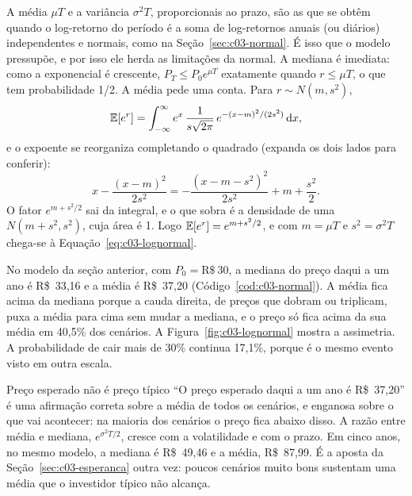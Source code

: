 A média $\mu T$ e a variância $\sigma^2 T$, proporcionais ao prazo, são as que se obtêm quando o log-retorno do período é a soma de log-retornos anuais (ou diários) independentes e normais, como na Seção~\ref{sec:c03-normal}. É isso que o modelo pressupõe, e por isso ele herda as limitações da normal. A mediana é imediata: como a exponencial é crescente, $P_T \le P_0 e^{\mu T}$ exatamente quando $r \le \mu T$, o que tem probabilidade 1/2. A média pede uma conta. Para $r \sim N(m, s^2)$,
\begin{equation*}
  \operatorname{\mathbb{E}}[e^r] = \int_{-\infty}^{\infty} e^x\,\frac{1}{s\sqrt{2\pi}}\,e^{-(x-m)^2/(2s^2)} \mathop{}\!\mathrm{d} x ,
\end{equation*}
e o expoente se reorganiza completando o quadrado (expanda os dois lados para conferir):
\begin{equation*}
  x - \frac{(x-m)^2}{2s^2} = -\frac{(x - m - s^2)^2}{2s^2} + m + \frac{s^2}{2} .
\end{equation*}
O fator $e^{m + s^2/2}$ sai da integral, e o que sobra é a densidade de uma $N(m + s^2, s^2)$, cuja área é 1. Logo $\operatorname{\mathbb{E}}[e^r] = e^{m + s^2/2}$, e com $m = \mu T$ e $s^2 = \sigma^2 T$ chega-se à Equação~\eqref{eq:c03-lognormal}.

No modelo da seção anterior, com $P_0 = \text{R\$}~30$, a mediana do preço daqui a um ano é R\$~33,16 e a média é R\$~37,20 (Código~\ref{cod:c03-normal}). A média fica acima da mediana porque a cauda direita, de preços que dobram ou triplicam, puxa a média para cima sem mudar a mediana, e o preço só fica acima da sua média em 40,5\% dos cenários. A Figura~\ref{fig:c03-lognormal} mostra a assimetria. A probabilidade de cair mais de 30\% continua 17,1\%, porque é o mesmo evento visto em outra escala.


\begin{armadilha}{Preço esperado não é preço típico}
``O preço esperado daqui a um ano é R\$~37,20'' é uma afirmação correta sobre a média de todos os cenários, e enganosa sobre o que vai acontecer: na maioria dos cenários o preço fica abaixo disso. A razão entre média e mediana, $e^{\sigma^2 T/2}$, cresce com a volatilidade e com o prazo. Em cinco anos, no mesmo modelo, a mediana é R\$~49,46 e a média, R\$~87,99. É a aposta da Seção~\ref{sec:c03-esperanca} outra vez: poucos cenários muito bons sustentam uma média que o investidor típico não alcança.
\end{armadilha}

